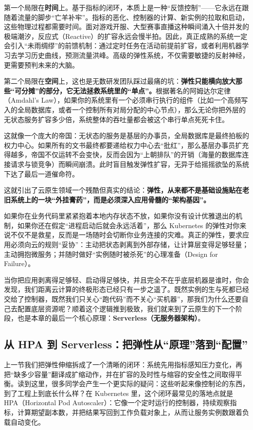 第一个局限在\textbf{时间}上。基于指标的闭环，本质上是一种“反馈控制”——它永远在跟随着流量的脚步“亡羊补牢”。指标的恶化、控制器的计算、新实例的拉取和启动，这些物理过程都需要时间。面对游戏开服、大型赛事直播这种瞬间涌入十倍并发的极端潮汐，反应式（Reactive）的扩容永远会慢半拍。因此，真正成熟的系统一定会引入“未雨绸缪”的前馈机制：通过定时任务在活动前提前扩容，或者利用机器学习去学习历史曲线，预测流量洪峰。高级的弹性系统，不仅需要敏捷的反射神经，更需要预判未来的大脑。

第二个局限在\textbf{空间}上，这也是无数研发团队踩过最痛的坑：\textbf{弹性只能横向放大那些“可分摊”的部分，它无法拯救系统里的“单点”。}根据著名的阿姆达尔定律（Amdahl's Law），如果你的系统里有一个必须串行执行的组件（比如一个高频写入的全局数据库，或者一个控制所有对局分配的中心节点），那么无论你把外层的无状态服务扩容多少倍，系统整体的吞吐量都会被这个串行单点死死卡住。

这就像一个庞大的帝国：无状态的服务是基层的办事员，全局数据库是最终拍板的权力中心。如果所有的文书最终都要递给权力中心去“批红”，那么基层办事员扩充得越多，帝国不仅运转不会变快，反而会因为“上朝排队”的开销（海量的数据库连接请求与锁竞争）而瞬间崩溃。此时盲目触发弹性扩容，无异于给摇摇欲坠的系统下达了最后一道催命符。

这就引出了云原生领域一个残酷但真实的结论：\textbf{弹性，从来都不是基础设施贴在老旧系统上的一块“外挂膏药”，而是必须深入应用骨髓的“架构基因”。}

如果你在业务代码里紧紧抱着本地内存状态不放，如果你没有设计优雅退出的机制，如果你还在假定“进程启动后就会永远活着”，那么 Kubernetes 的弹性对你来说不仅不是救星，反而是一场随时会切断你业务连接的灾难。真正的弹性，要求应用必须向云的规则“妥协”：主动把状态剥离到外部存储，让计算层变得足够轻量；主动拥抱微服务；并随时做好“实例随时被杀死”的心理准备（Design for Failure）。

当你把应用剥离得足够轻、启动得足够快，并且完全不在乎底层机器是谁时，你会发现，我们距离云计算的终极形态已经只有一步之遥了。既然实例的生与死都已经交给了控制器，既然我们只关心“跑代码”而不关心“买机器”，那我们为什么还要自己去配置底层资源呢？顺着这个逻辑推到极致，我们就来到了云原生的下一个阶段，也是本章的最后一个核心原理：\textbf{Serverless（无服务器架构）}。


\subsection{ 从 HPA 到 Serverless：把弹性从“原理”落到“配置”}
上一节我们把弹性伸缩拆成了一个清晰的闭环：系统先用指标感知压力变化，再把“缺多少容量”翻译成扩缩动作，并在扩容的及时性与缩容的安全性之间取得平衡。读到这里，很多同学会产生一个更实际的疑问：这些听起来像控制论的东西，到了工程上到底长什么样？在 Kubernetes 里，这个闭环最常见的落地点就是 HPA（Horizontal Pod Autoscaler）：它像一个定时运行的控制器，持续观察指标，计算期望副本数，并把结果写回到工作负载对象上，从而让服务实例数跟着负载自动变化。

